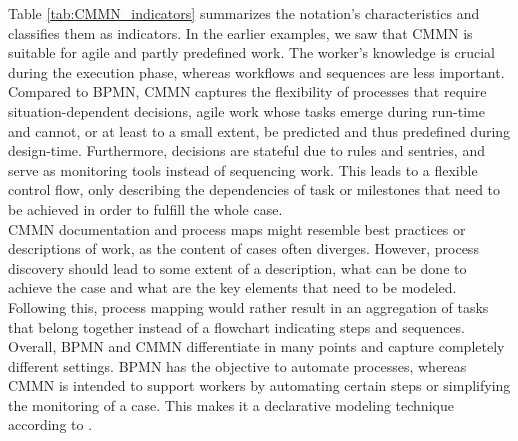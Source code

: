 Table \ref{tab:CMMN_indicators} summarizes the notation's characteristics and classifies them as indicators. In the earlier examples, we saw that CMMN is suitable for agile and partly predefined work. The worker's knowledge is crucial during the execution phase, whereas workflows and sequences are less important. Compared to BPMN, CMMN captures the flexibility of processes that require situation-dependent decisions, agile work whose tasks emerge during run-time and cannot, or at least to a small extent, be predicted and thus predefined during design-time. Furthermore, decisions are stateful due to rules and sentries, and serve as monitoring tools instead of sequencing work. This leads to a flexible control flow, only describing the dependencies of task or milestones that need to be achieved in order to fulfill the whole case. \\
CMMN documentation and process maps might resemble best practices or descriptions of work, as the content of cases often diverges. However, process discovery should lead to some extent of a description, what can be done to achieve the case and what are the key elements that need to be modeled. Following this, process mapping would rather result in an aggregation of tasks that belong together instead of a flowchart indicating steps and sequences. \\
Overall, BPMN and CMMN differentiate in many points and capture completely different settings. BPMN has the objective to automate processes, whereas CMMN is intended to support workers by automating certain steps or simplifying the monitoring of a case. This makes it a declarative modeling technique according to \cite{FahlandLuebkeMendlingEtAl2009}. 


